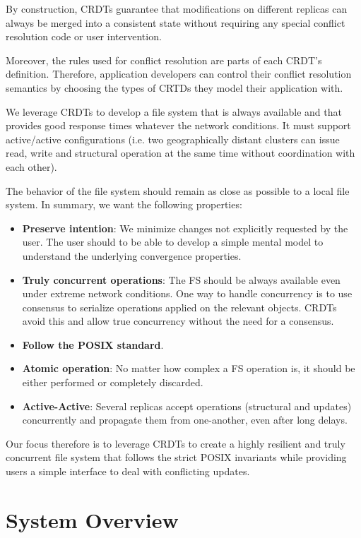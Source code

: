 \documentclass[sigconf, anonymous, 10pt]{acmart}
\begin{document}
By construction, CRDTs guarantee that modifications on different
replicas can always be merged into a consistent state without requiring
any special conflict resolution code or user intervention.

Moreover, the rules used for conflict resolution are parts of each CRDT's definition.
Therefore, application developers can control their conflict resolution semantics by
choosing the types of CRTDs they model their application with.

We leverage CRDTs to develop a file system that is always available
and that provides good response times whatever the network conditions.
It must support active/active configurations
(i.e. two geographically distant clusters can issue read, write and structural
operation at the same time without coordination with each other).

The behavior of the file system should remain as close as possible to a local file system.
In summary, we want the following properties:

\begin{itemize}
	\item \textbf{Preserve intention}: We minimize changes not explicitly requested by the user.
	The user should to be able to develop a simple mental model to understand
	the underlying convergence properties.
	\item \textbf{Truly concurrent operations}: The FS should be always available even under extreme network conditions.
	One way to handle concurrency
	is to use consensus to serialize operations applied on the relevant objects.
	CRDTs avoid this and allow true concurrency without the need for a consensus.
	\item \textbf{Follow the POSIX standard}.
	\item \textbf{Atomic operation}: No matter how complex a FS operation is, it should be either performed or completely discarded.
	\item \textbf{Active-Active}: Several replicas accept operations
	(structural and updates) concurrently and propagate them from one-another,
	even after long delays.
\end{itemize}

Our focus therefore is to leverage CRDTs to create a highly resilient and
truly concurrent file system that follows the strict POSIX invariants
while providing users a simple interface to deal with conflicting updates.

\section{System Overview}
\end{document}

